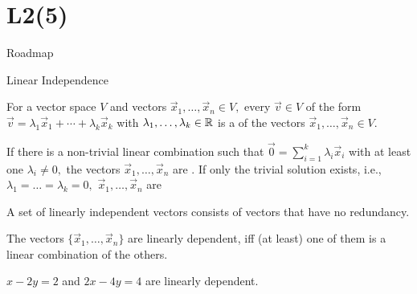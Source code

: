 \documentclass[handout,fleqn,aspectratio=169]{beamer}
\begin{document}
\section{L2(5)}
\begin{frame}{Roadmap}

\plitemsep 0.1in

\bce[(5)] 
\item {}

\item {}

\item {}
\ece
\end{frame}

\begin{frame}{Linear Independence}

\plitemsep 0.1in

\bci 
\item {} For a vector space $V$ and vectors $\vec{x}_1, \ldots, \vec{x}_n \in V,$ every $\vec{v} \in V$ of the form
$
\vec{v} = \lambda_1 \vec{x}_1 + \cdots + \lambda_k \vec{x}_k
$
with $\lambda_1, \ldots, \lambda_k \in {\mathbb R}$ is a  of the vectors  $\vec{x}_1, \ldots, \vec{x}_n \in V.$
\item {} If there is a non-trivial linear combination such that $\vec{0}=\sum_{i=1}^k \lambda_i \vec{x}_i$ with at least one $\lambda_i \neq 0,$ the vectors $\vec{x}_1, \ldots, \vec{x}_n$ are . If only the trivial solution exists, i.e., $\lambda_1 = \ldots = \lambda_k =0,$ $\vec{x}_1, \ldots, \vec{x}_n$ are 

\item {} A set of linearly independent vectors consists of vectors that have no redundancy.  

\item {} The vectors $\{\vec{x}_1, \ldots, \vec{x}_n \}$ are linearly dependent, iff
(at least) one of them is a linear combination of the others. 
\bci
\item $x-2y = 2$ and $2x-4y=4$ are linearly dependent. 
\eci

\eci


\end{frame}
\end{document}
